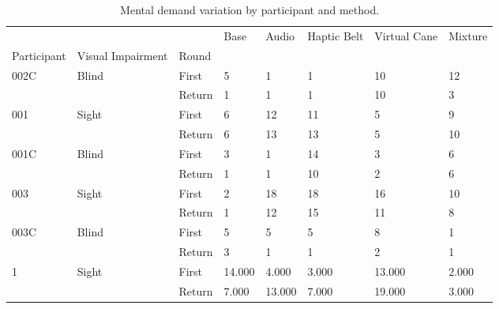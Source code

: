 
\begin{table}[!htb]
\centering
\caption{Mental demand variation by participant and method.}
\label{tab:md_var}
\begin{tabular}{llllllll}
\toprule
  &       &        &   Base &  Audio & Haptic Belt & Virtual Cane & Mixture \\
Participant & Visual Impairment & Round &        &        &             &              &         \\
\midrule
002C & Blind & First &      5 &      1 &           1 &           10 &      12 \\
  &       & Return &      1 &      1 &           1 &           10 &       3 \\
001 & Sight & First &      6 &     12 &          11 &            5 &       9 \\
  &       & Return &      6 &     13 &          13 &            5 &      10 \\
001C & Blind & First &      3 &      1 &          14 &            3 &       6 \\
  &       & Return &      1 &      1 &          10 &            2 &       6 \\
003 & Sight & First &      2 &     18 &          18 &           16 &      10 \\
  &       & Return &      1 &     12 &          15 &           11 &       8 \\
003C & Blind & First &      5 &      5 &           5 &            8 &       1 \\
  &       & Return &      3 &      1 &           1 &            2 &       1 \\
1 & Sight & First & 14.000 &  4.000 &       3.000 &       13.000 &   2.000 \\
  &       & Return &  7.000 & 13.000 &       7.000 &       19.000 &   3.000 \\
\bottomrule
\end{tabular}
\end{table}


